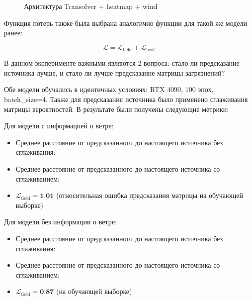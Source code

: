 \documentclass[12pt]{article}
\begin{document}
\begin{figure}[h]
    \centering
    \caption{Архитектура Transolver + heatmap + wind}
    \label{fig:transolver_heatmap_wind_arch}
\end{figure}

Функция потерь также была выбрана аналогично функции для такой же модели ранее:

$$
\mathcal{L} = \mathcal{L}_{\text{field}} + \mathcal{L}_{\text{heat}}
$$

В данном эксперименте важными являются 2 вопроса: стало ли предсказание источника лучше, и стало ли лучше предсказание матрицы загрязнений?

Обе модели обучались в идентичных условиях: RTX 4090, 100 эпох, batch\_size=4. Также для предсказания источника было применено сглаживания матрицы вероятностей. В результате были получены следующие метрики:

Для модели с информацией о ветре:

\begin{itemize}
    \item Среднее расстояние от предсказанного до настоящего источника без сглаживания: \textbf{\mWindYesMean}
    \item Среднее расстояние от предсказанного до настоящего источника со сглаживанием: \textbf{\mWindYesSmooth}
    \item $\mathcal{L}_{\text{field}} = \textbf{1.01}$ (относительная ошибка предсказания матрицы на обучающей выборке)
\end{itemize}

Для модели без информации о ветре:

\begin{itemize}
    \item Среднее расстояние от предсказанного до настоящего источника без сглаживания: \textbf{\mWindNoMean}
    \item Среднее расстояние от предсказанного до настоящего источника со сглаживанием: \textbf{\mWindNoSmooth}
    \item $\mathcal{L}_{\text{field}} = \textbf{0.87}$ (на обучающей выборке)
\end{itemize}
\end{document}
